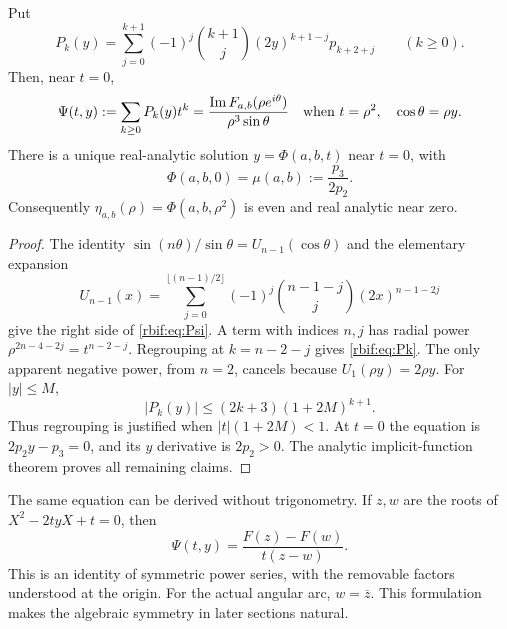 \begin{theorem}
\label{rbif:thm:generating}
Put
\begin{equation}
 P_k(y)=\sum_{j=0}^{k+1}(-1)^j\binom{k+1}{j}
             (2y)^{k+1-j}p_{k+2+j}\qquad(k\ge0).
 \label{rbif:eq:Pk}
\end{equation}
Then, near $t=0$,
\begin{equation}
 \Psi(t,y):=\sum_{k\ge0}P_k(y)t^k
 =\frac{\operatorname{Im} F_{a,b}(\rho e^{i\theta})}{\rho^3\sin\theta}
 \quad\text{when }t=\rho^2,\quad\cos\theta=\rho y.
 \label{rbif:eq:Psi}
\end{equation}
There is a unique real-analytic solution $y=\Phi(a,b,t)$ near $t=0$,
with
\begin{equation}
 \Phi(a,b,0)=\mu(a,b):=\frac{p_3}{2p_2}.
 \label{rbif:eq:mu}
\end{equation}
Consequently $\eta_{a,b}(\rho)=\Phi(a,b,\rho^2)$ is even and real
analytic near zero.
\end{theorem}
\begin{proof}
The identity
$\sin(n\theta)/\sin\theta=U_{n-1}(\cos\theta)$ and the elementary
expansion
\[
 U_{n-1}(x)=\sum_{j=0}^{\lfloor(n-1)/2\rfloor}
          (-1)^j\binom{n-1-j}{j}(2x)^{n-1-2j}
\]
give the right side of \eqref{rbif:eq:Psi}. A term with indices $n,j$
has radial power $\rho^{2n-4-2j}=t^{n-2-j}$. Regrouping at
$k=n-2-j$ gives \eqref{rbif:eq:Pk}. The only apparent negative power,
from $n=2$, cancels because $U_1(\rho y)=2\rho y$.
For $|y|\le M$,
\begin{equation}
 |P_k(y)|\le (2k+3)(1+2M)^{k+1}.
 \label{rbif:eq:majorant}
\end{equation}
Thus regrouping is justified when $|t|(1+2M)<1$. At $t=0$ the
equation is $2p_2y-p_3=0$, and its $y$ derivative is $2p_2>0$.
The analytic implicit-function theorem proves all remaining claims.
\end{proof}

The same equation can be derived without trigonometry. If $z,w$ are
the roots of $X^2-2tyX+t=0$, then
\[
 \Psi(t,y)=\frac{F(z)-F(w)}{t(z-w)}.
\]
This is an identity of symmetric power series, with the removable factors
understood at the origin. For the actual angular arc, $w=\overline z$.
This formulation makes the algebraic symmetry in later sections natural.

